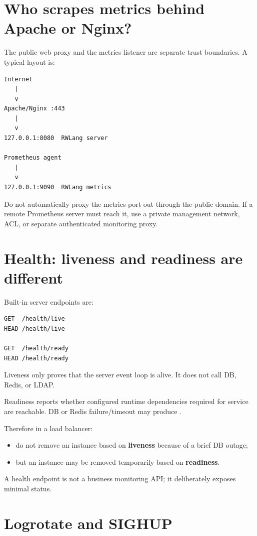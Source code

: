 \Needspace{0.42\textheight}
\section{Who scrapes metrics behind Apache or Nginx?}

The public web proxy and the metrics listener are separate trust boundaries. A typical layout is:

\begin{lstlisting}
Internet
   |
   v
Apache/Nginx :443
   |
   v
127.0.0.1:8080  RWLang server

Prometheus agent
   |
   v
127.0.0.1:9090  RWLang metrics
\end{lstlisting}

Do not automatically proxy the metrics port out through the public domain. If a remote Prometheus server must reach it, use a private management network, ACL, or separate authenticated monitoring proxy.

\section{Health: liveness and readiness are different}

Built-in server endpoints are:

\begin{lstlisting}
GET  /health/live
HEAD /health/live

GET  /health/ready
HEAD /health/ready
\end{lstlisting}

Liveness only proves that the server event loop is alive. It does not call DB, Redis, or LDAP.

Readiness reports whether configured runtime dependencies required for service are reachable. DB or Redis failure/timeout may produce .

Therefore in a load balancer:

\begin{itemize}
  \item do not remove an instance based on \textbf{liveness} because of a brief DB outage;
  \item but an instance may be removed temporarily based on \textbf{readiness}.
\end{itemize}

A health endpoint is not a business monitoring API; it deliberately exposes minimal status.

\Needspace{0.46\textheight}
\section{Logrotate and SIGHUP}

